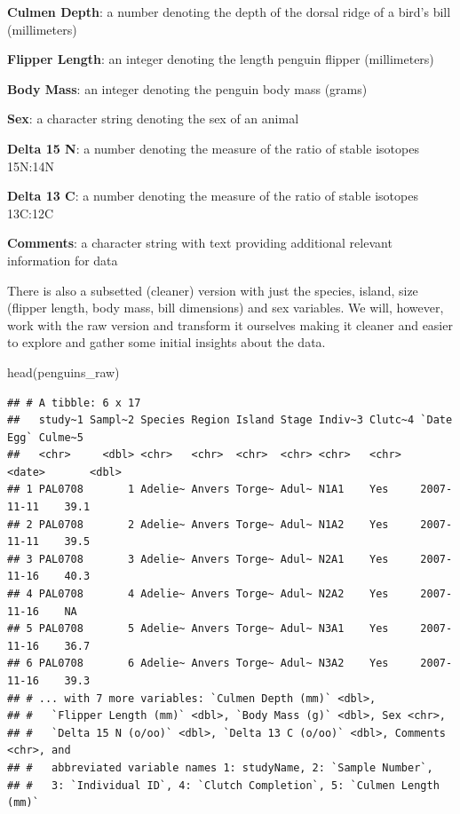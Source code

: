 \documentclass[
]{book}
\newenvironment{Shaded}{\begin{snugshade}}{\end{snugshade}}
\newcommand{\FunctionTok}[1]{\textcolor[rgb]{0.00,0.00,0.00}{#1}}
\newcommand{\NormalTok}[1]{#1}
\begin{document}
\textbf{Culmen Depth}: a number denoting the depth of the dorsal ridge of a bird's bill (millimeters)

\textbf{Flipper Length}: an integer denoting the length penguin flipper (millimeters)

\textbf{Body Mass}: an integer denoting the penguin body mass (grams)

\textbf{Sex}: a character string denoting the sex of an animal

\textbf{Delta 15 N}: a number denoting the measure of the ratio of stable isotopes 15N:14N

\textbf{Delta 13 C}: a number denoting the measure of the ratio of stable isotopes 13C:12C

\textbf{Comments}: a character string with text providing additional relevant information for data

There is also a subsetted (cleaner) version with just the species, island, size (flipper length, body mass, bill dimensions) and sex variables.
We will, however, work with the raw version and transform it ourselves making it cleaner and easier to explore and gather some initial insights about the data.

\begin{Shaded}
\begin{Highlighting}[]
\FunctionTok{head}\NormalTok{(penguins\_raw)}
\end{Highlighting}
\end{Shaded}

\begin{verbatim}
## # A tibble: 6 x 17
##   study~1 Sampl~2 Species Region Island Stage Indiv~3 Clutc~4 `Date Egg` Culme~5
##   <chr>     <dbl> <chr>   <chr>  <chr>  <chr> <chr>   <chr>   <date>       <dbl>
## 1 PAL0708       1 Adelie~ Anvers Torge~ Adul~ N1A1    Yes     2007-11-11    39.1
## 2 PAL0708       2 Adelie~ Anvers Torge~ Adul~ N1A2    Yes     2007-11-11    39.5
## 3 PAL0708       3 Adelie~ Anvers Torge~ Adul~ N2A1    Yes     2007-11-16    40.3
## 4 PAL0708       4 Adelie~ Anvers Torge~ Adul~ N2A2    Yes     2007-11-16    NA  
## 5 PAL0708       5 Adelie~ Anvers Torge~ Adul~ N3A1    Yes     2007-11-16    36.7
## 6 PAL0708       6 Adelie~ Anvers Torge~ Adul~ N3A2    Yes     2007-11-16    39.3
## # ... with 7 more variables: `Culmen Depth (mm)` <dbl>,
## #   `Flipper Length (mm)` <dbl>, `Body Mass (g)` <dbl>, Sex <chr>,
## #   `Delta 15 N (o/oo)` <dbl>, `Delta 13 C (o/oo)` <dbl>, Comments <chr>, and
## #   abbreviated variable names 1: studyName, 2: `Sample Number`,
## #   3: `Individual ID`, 4: `Clutch Completion`, 5: `Culmen Length (mm)`
\end{verbatim}
\end{document}
